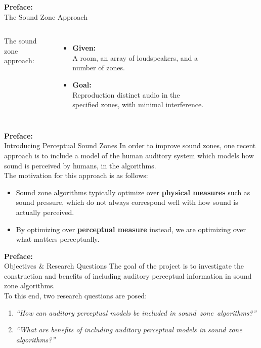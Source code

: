 \documentclass[aspectratio=169]{beamer}
\begin{document}
\begin{frame}{\textbf{Preface:}\\ The Sound Zone Approach}
    \begin{columns}[c]
        The sound zone approach:
        \begin{itemize}
            \item \textbf{Given:}\\ A room, an array of loudspeakers, and a number of zones.
            \item \textbf{Goal:}\\  Reproduction distinct audio in the specified zones, with minimal interference.
        \end{itemize}
        \begin{figure}[]
            \centering
            \scalebox{0.7}{}
        \end{figure}
    \end{columns}
\end{frame}

\begin{frame}{\textbf{Preface:}\\ Introducing Perceptual Sound Zones}
    In order to improve sound zones, one recent approach is to include a model of the human auditory system
    which models how sound is perceived by humans, in the algorithms.\\
    \vspace{10pt}
    The motivation for this approach is as follows:
    \begin{itemize}
        \item Sound zone algorithms typically optimize over \textbf{physical measures} such as sound pressure,
            which do not always correspond well with how sound is actually perceived.
        \item By optimizing over \textbf{perceptual measure} instead, we are optimizing over what matters perceptually.
    \end{itemize}
\end{frame}

\begin{frame}{\textbf{Preface:}\\ Objectives \& Research Questions}
    The goal of the project is to investigate the construction and benefits of including auditory 
    perceptual information in sound zone algorithms.\\
    \vspace{10pt}
    To this end, two research questions are posed: 
    \begin{enumerate}
        \item {\textit{``How can auditory perceptual models be included in sound~zone~algorithms?''}}
        \item {\textit{``What are benefits of including auditory perceptual models in 
            sound zone algorithms?''}}
    \end{enumerate}
\end{frame}
\end{document}
